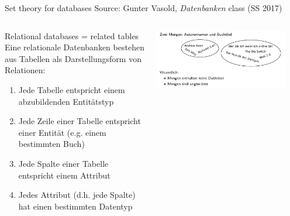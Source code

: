 








\begin{frame}{Set theory for databases}
Source: Gunter Vasold, \emph{Datenbanken} class (SS 2017)\medskip 

  \begin{columns}[T,onlytextwidth]
    \begin{exampleblock}{Relational databases = related tables}\footnotesize
        Eine relationale Datenbanken bestehen aus Tabellen als Darstellungsform von Relationen:
\begin{enumerate}\scriptsize
    \item Jede Tabelle entspricht einem abzubildenden Entitätstyp
    \item Jede Zeile einer Tabelle entspricht einer Entität (e.g. einem bestimmten Buch)
    \item Jede Spalte einer Tabelle entspricht einem Attribut
    \item Jedes Attribut (d.h. jede Spalte) hat einen bestimmten Datentyp
\end{enumerate}
    \end{exampleblock}
      \begin{block}{}
      \centering \includegraphics[width=0.9\textwidth]{img/mengen-vasold1.png}
      \end{block}


\end{columns}
\end{frame}
